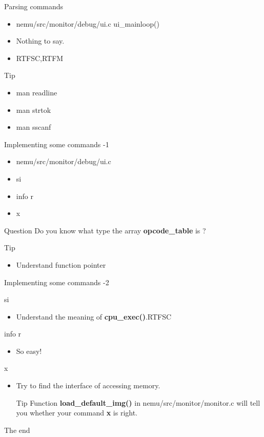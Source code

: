 \documentclass{beamer}
\begin{document}
\begin{frame}{Parsing commands}
	\begin{itemize}
		\item nemu/src/monitor/debug/ui.c ui\_mainloop()
		\item Nothing to say.
		\item \alert{RTFSC,RTFM}
	\end{itemize}
	\begin{alertblock}{Tip}
		\begin{itemize}
			\item man readline
			\item man strtok
			\item man sscanf
		\end{itemize}
	\end{alertblock}
\end{frame}

\begin{frame}{Implementing some commands -1}
	\begin{itemize}
		\item nemu/src/monitor/debug/ui.c
		\item si
		\item info r
		\item x
	\end{itemize}
	\begin{block}{Question}
		Do you know what type the array \textbf{opcode\_table} is ?
	\end{block}
	\begin{alertblock}{Tip}
		\begin{itemize}
			\item Understand function pointer
		\end{itemize}
	\end{alertblock}
\end{frame}

\begin{frame}{Implementing some commands -2}
	\begin{block}{si}
		\begin{itemize}
			\item Understand the meaning of \textbf{cpu\_exec()}.RTFSC
		\end{itemize}
	\end{block}
	\begin{block}{info r}
		\begin{itemize}
			\item So easy! 
		\end{itemize}
	\end{block}
	\begin{block}{x}
	\begin{itemize}
		\item Try to find the interface of accessing memory.
		\begin{alertblock}{Tip}
		Function \textbf{load\_default\_img()} in nemu/src/monitor/monitor.c will tell you whether your command \textbf{x} is right.
		\end{alertblock}
	\end{itemize}
	\end{block}
\end{frame}

\begin{frame}{The end}
\end{frame}
\end{document}
